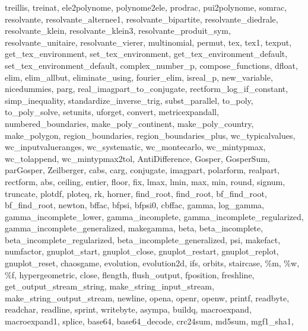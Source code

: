 {{    treillis,
    treinat,
    ele2polynome,
    polynome2ele,
    prodrac,
    pui2polynome,
    somrac,
    resolvante,
    resolvante_alternee1,
    resolvante_bipartite,
    resolvante_diedrale,
    resolvante_klein,
    resolvante_klein3,
    resolvante_produit_sym,
    resolvante_unitaire,
    resolvante_vierer,
    multinomial,
    permut,
    tex,
    tex1,
    texput,
    get_tex_environment,
    set_tex_environment,
    get_tex_environment_default,
    set_tex_environment_default,
    complex_number_p,
    compose_functions,
    dfloat,
    elim,
    elim_allbut,
    eliminate_using,
    fourier_elim,
    isreal_p,
    new_variable,
    nicedummies,
    parg,
    real_imagpart_to_conjugate,
    rectform_log_if_constant,
    simp_inequality,
    standardize_inverse_trig,
    subst_parallel,
    to_poly,
    to_poly_solve,
    setunits,
    uforget,
    convert,
    metricexpandall,
    numbered_boundaries,
    make_poly_continent,
    make_poly_country,
    make_polygon,
    region_boundaries,
    region_boundaries_plus,
    wc_typicalvalues,
    wc_inputvalueranges,
    wc_systematic,
    wc_montecarlo,
    wc_mintypmax,
    wc_tolappend,
    wc_mintypmax2tol,
    AntiDifference,
    Gosper,
    GosperSum,
    parGosper,
    Zeilberger,
    cabs,
    carg,
    conjugate,
    imagpart,
    polarform,
    realpart,
    rectform,
    abs,
    ceiling,
    entier,
    floor,
    fix,
    lmax,
    lmin,
    max,
    min,
    round,
    signum,
    truncate,
    plotdf,
    ploteq,
    rk,
    horner,
    find_root,
    find_root,
    bf_find_root,
    bf_find_root,
    newton,
    bffac,
    bfpsi,
    bfpsi0,
    cbffac,
    gamma,
    log_gamma,
    gamma_incomplete_lower,
    gamma_incomplete,
    gamma_incomplete_regularized,
    gamma_incomplete_generalized,
    makegamma,
    beta,
    beta_incomplete,
    beta_incomplete_regularized,
    beta_incomplete_generalized,
    psi,
    makefact,
    numfactor,
    gnuplot_start,
    gnuplot_close,
    gnuplot_restart,
    gnuplot_replot,
    gnuplot_reset,
    chaosgame,
    evolution,
    evolution2d,
    ifs,
    orbits,
    staircase,
    \%m,
    \%w,
    \%f,
    hypergeometric,
    close,
    flength,
    flush_output,
    fposition,
    freshline,
    get_output_stream_string,
    make_string_input_stream,
    make_string_output_stream,
    newline,
    opena,
    openr,
    openw,
    printf,
    readbyte,
    readchar,
    readline,
    sprint,
    writebyte,
    asympa,
    buildq,
    macroexpand,
    macroexpand1,
    splice,
    base64,
    base64_decode,
    crc24sum,
    md5sum,
    mgf1_sha1,
}}
